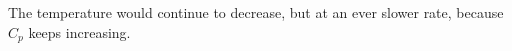 The temperature would continue to decrease, but at an ever slower rate, because \( C_p \) keeps increasing.